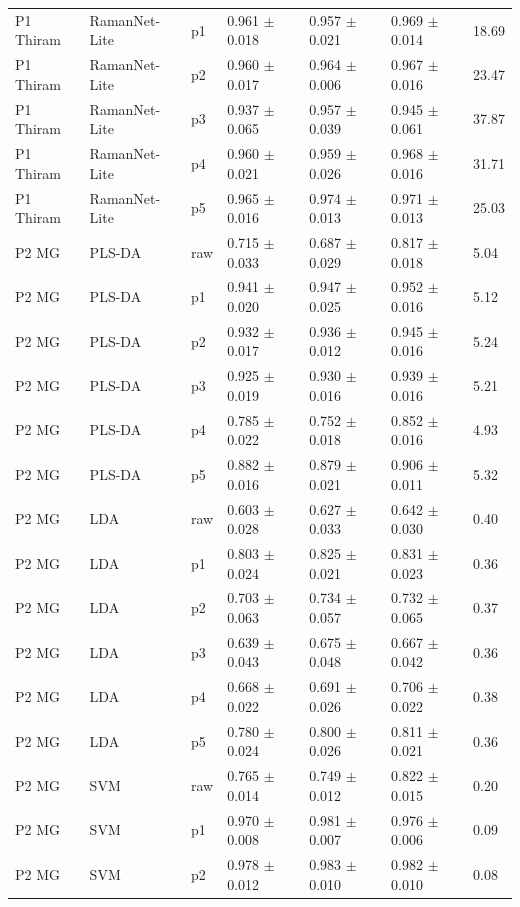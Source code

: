 {\begin{longtable}{L{2.35cm}L{2.4cm}L{1.0cm}L{2.35cm}L{2.25cm}L{2.25cm}L{1.45cm}}
P1 Thiram & RamanNet-Lite & p1 & 0.961 $\pm$ 0.018 & 0.957 $\pm$ 0.021 & 0.969 $\pm$ 0.014 & 18.69 \\
P1 Thiram & RamanNet-Lite & p2 & 0.960 $\pm$ 0.017 & 0.964 $\pm$ 0.006 & 0.967 $\pm$ 0.016 & 23.47 \\
P1 Thiram & RamanNet-Lite & p3 & 0.937 $\pm$ 0.065 & 0.957 $\pm$ 0.039 & 0.945 $\pm$ 0.061 & 37.87 \\
P1 Thiram & RamanNet-Lite & p4 & 0.960 $\pm$ 0.021 & 0.959 $\pm$ 0.026 & 0.968 $\pm$ 0.016 & 31.71 \\
P1 Thiram & RamanNet-Lite & p5 & 0.965 $\pm$ 0.016 & 0.974 $\pm$ 0.013 & 0.971 $\pm$ 0.013 & 25.03 \\
P2 MG & PLS-DA & raw & 0.715 $\pm$ 0.033 & 0.687 $\pm$ 0.029 & 0.817 $\pm$ 0.018 & 5.04 \\
P2 MG & PLS-DA & p1 & 0.941 $\pm$ 0.020 & 0.947 $\pm$ 0.025 & 0.952 $\pm$ 0.016 & 5.12 \\
P2 MG & PLS-DA & p2 & 0.932 $\pm$ 0.017 & 0.936 $\pm$ 0.012 & 0.945 $\pm$ 0.016 & 5.24 \\
P2 MG & PLS-DA & p3 & 0.925 $\pm$ 0.019 & 0.930 $\pm$ 0.016 & 0.939 $\pm$ 0.016 & 5.21 \\
P2 MG & PLS-DA & p4 & 0.785 $\pm$ 0.022 & 0.752 $\pm$ 0.018 & 0.852 $\pm$ 0.016 & 4.93 \\
P2 MG & PLS-DA & p5 & 0.882 $\pm$ 0.016 & 0.879 $\pm$ 0.021 & 0.906 $\pm$ 0.011 & 5.32 \\
P2 MG & LDA & raw & 0.603 $\pm$ 0.028 & 0.627 $\pm$ 0.033 & 0.642 $\pm$ 0.030 & 0.40 \\
P2 MG & LDA & p1 & 0.803 $\pm$ 0.024 & 0.825 $\pm$ 0.021 & 0.831 $\pm$ 0.023 & 0.36 \\
P2 MG & LDA & p2 & 0.703 $\pm$ 0.063 & 0.734 $\pm$ 0.057 & 0.732 $\pm$ 0.065 & 0.37 \\
P2 MG & LDA & p3 & 0.639 $\pm$ 0.043 & 0.675 $\pm$ 0.048 & 0.667 $\pm$ 0.042 & 0.36 \\
P2 MG & LDA & p4 & 0.668 $\pm$ 0.022 & 0.691 $\pm$ 0.026 & 0.706 $\pm$ 0.022 & 0.38 \\
P2 MG & LDA & p5 & 0.780 $\pm$ 0.024 & 0.800 $\pm$ 0.026 & 0.811 $\pm$ 0.021 & 0.36 \\
P2 MG & SVM & raw & 0.765 $\pm$ 0.014 & 0.749 $\pm$ 0.012 & 0.822 $\pm$ 0.015 & 0.20 \\
P2 MG & SVM & p1 & 0.970 $\pm$ 0.008 & 0.981 $\pm$ 0.007 & 0.976 $\pm$ 0.006 & 0.09 \\
P2 MG & SVM & p2 & 0.978 $\pm$ 0.012 & 0.983 $\pm$ 0.010 & 0.982 $\pm$ 0.010 & 0.08 \\

\end{longtable}}
